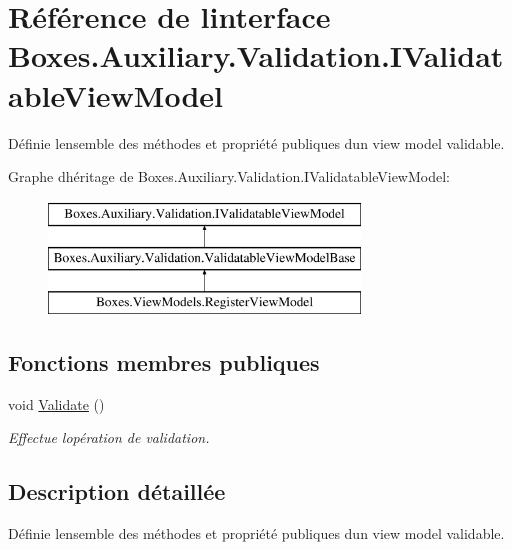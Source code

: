 \hypertarget{interface_boxes_1_1_auxiliary_1_1_validation_1_1_i_validatable_view_model}{}\section{Référence de l\textquotesingle{}interface Boxes.\+Auxiliary.\+Validation.\+I\+Validatable\+View\+Model}
\label{interface_boxes_1_1_auxiliary_1_1_validation_1_1_i_validatable_view_model}


Définie l\textquotesingle{}ensemble des méthodes et propriété publiques d\textquotesingle{}un view model validable.  


Graphe d\textquotesingle{}héritage de Boxes.\+Auxiliary.\+Validation.\+I\+Validatable\+View\+Model\+:\begin{figure}[H]
\begin{center}
\leavevmode
\includegraphics[height=3.000000cm]{interface_boxes_1_1_auxiliary_1_1_validation_1_1_i_validatable_view_model}
\end{center}
\end{figure}
\subsection*{Fonctions membres publiques}
\begin{DoxyCompactItemize}
\item 
void \hyperlink{interface_boxes_1_1_auxiliary_1_1_validation_1_1_i_validatable_view_model_a984f7eb9b310ddf31c2c7192d511df26}{Validate} ()
\begin{DoxyCompactList}\small\item\em Effectue l\textquotesingle{}opération de validation. \end{DoxyCompactList}\end{DoxyCompactItemize}


\subsection{Description détaillée}
Définie l\textquotesingle{}ensemble des méthodes et propriété publiques d\textquotesingle{}un view model validable. 



